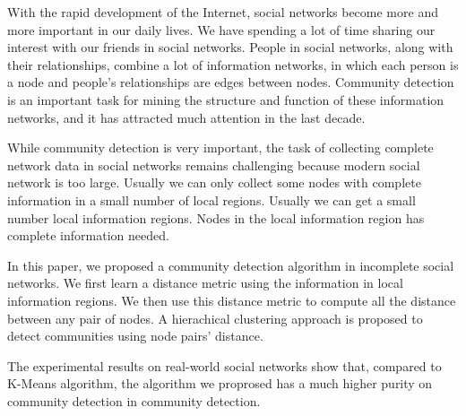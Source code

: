 \begin{englishabstract}
    With the rapid development of the Internet, 
    social networks become more and more important in our daily lives.
    We have spending a lot of time sharing our interest with our friends
    in social networks. People in social networks, along with their relationships,
    combine a lot of information networks, in which each person is a node and people's 
    relationships are edges between nodes. Community detection is an important task
    for mining the structure and function of these information networks, and it has
    attracted much attention in the last decade.

    While community detection is very important, the task of collecting complete network
    data in social networks remains challenging because modern social network is too large.
    Usually we can only collect some nodes with complete information in a small number of local regions. 
    Usually we can get a small number local information regions. 
    Nodes in the local information region has complete information needed.

    In this paper, we proposed a community detection algorithm in incomplete social networks.
    We first learn a distance metric using the information in local information regions.
    We then use this distance metric to compute all the distance between any pair of nodes.
    A hierachical clustering approach is proposed to detect communities using node pairs'
    distance.

    The experimental results on real-world social networks show that, compared to K-Means algorithm, the algorithm 
    we proprosed has a much higher purity on community detection in community detection.

\end{englishabstract}
